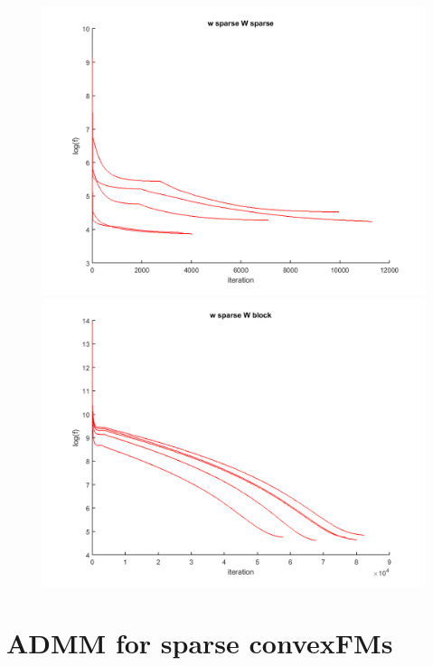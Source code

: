 \documentclass{beamer}
\begin{document}
\begin{frame}
\begin{figure}[htbp]
\begin{minipage}{0.45\textwidth}
  \end{minipage}
  \begin{minipage}{0.45\textwidth}
    \centering
    \includegraphics[width=1\textwidth]{w_sparse_W_sparse_p10_figure.png}
  \end{minipage}
  \hfill
  \begin{minipage}{0.45\textwidth}
    \centering
    \includegraphics[width=1\textwidth]{w_sparse_W_block_p10_figure.png}
  \end{minipage}
  \end{figure}
\end{frame}


\section{ADMM for sparse convexFMs} %
\end{document}
